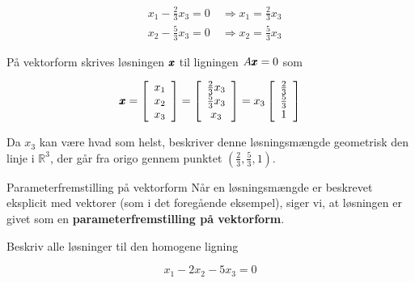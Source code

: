 \begin{solution}
\[
\begin{aligned}
& x_1-\frac{2}{3} x_3=0 \quad \Longrightarrow x_1=\frac{2}{3} x_3 \\
& x_2-\frac{5}{3} x_3=0 \quad \Longrightarrow x_2=\frac{5}{3} x_3
\end{aligned}
\]


På vektorform skrives løsningen $\pmb{x}$ til ligningen $A \pmb{x}=0$ som

\[
\pmb{x}=\left[\begin{array}{l}
x_1 \\
x_2 \\
x_3
\end{array}\right]=\left[\begin{array}{c}
\frac{2}{3} x_3 \\
\frac{5}{3} x_3 \\
x_3
\end{array}\right]=x_3\left[\begin{array}{c}
\frac{2}{3} \\
\frac{5}{3} \\
1
\end{array}\right]
\]


Da $x_3$ kan være hvad som helst, beskriver denne løsningsmængde geometrisk den linje i $\mathbb{R}^3$, der går fra origo gennem punktet $\left(\frac{2}{3}, \frac{5}{3}, 1\right)$.
\end{solution}


\begin{custombox}{Parameterfremstilling på vektorform}
    Når en løsningsmængde er beskrevet eksplicit med vektorer (som i det foregående eksempel), siger vi, at løsningen er givet som en \textbf{parameterfremstilling på vektorform}.
\end{custombox}

\begin{example} Beskriv alle løsninger til den homogene ligning


\[
    x_1-2 x_2-5 x_3=0
\]

\end{example}

